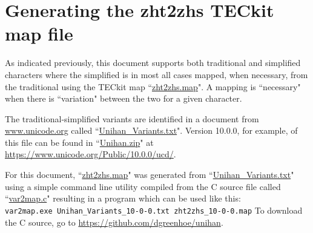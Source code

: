 \section{Generating the zht2zhs TECkit map file}
\label{sec:fontinfo_var2map}
As indicated previously, this document supports both traditional and simplified characters
where the simplified is in most all cases mapped, when necessary, from the traditional using
the TECkit map 
``\href{https://github.com/dgreenhoe/unihan}{zht2zhs.map}".
A mapping is ``necessary" when there is ``variation" between the two for a 
given character.

The traditional-simplified variants are identified in a document from \url{www.unicode.org}
called 
``\href{https://www.unicode.org/Public/10.0.0/ucd/}{Unihan\_Variants.txt}". 
Version 10.0.0, for example, of this file can be found in 
``\href{https://www.unicode.org/Public/10.0.0/ucd/}{Unihan.zip}"
at \url{https://www.unicode.org/Public/10.0.0/ucd/}.

For this document, 
``\href{https://github.com/dgreenhoe/unihan}{zht2zhs.map}"
was generated from 
``\href{https://www.unicode.org/Public/10.0.0/ucd/}{Unihan\_Variants.txt}"
using a simple command line utility compiled from the C source file called 
``\href{https://github.com/dgreenhoe/unihan}{var2map.c}" 
resulting in a program which
can be used like this:
\\\indentx\verb|var2map.exe Unihan_Variants_10-0-0.txt zht2zhs_10-0-0.map|
To download the C source, go to \url{https://github.com/dgreenhoe/unihan}.

